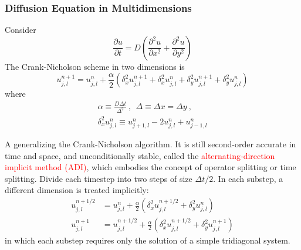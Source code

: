 \documentclass[12pt,a4paper]{article}
\begin{document}
\subsubsection{Diffusion Equation in Multidimensions}
Consider
\begin{equation}
\frac{\partial u}{\partial t} = D  \left( \frac{\partial^2 u}{\partial x^2} + \frac{\partial^2 u}{\partial y^2} \right)
\end{equation}
The Crank-Nicholson scheme in two dimensions is
\begin{equation}
u_{j, l}^{n+1} = u_{j, l}^{n} +\frac{\alpha}{2} \left(\delta_x^2 u_{j, l}^{n+1} +\delta_x^2 u_{j, l}^{n} +\delta_y^2 u_{j, l}^{n+1} +\delta_y^2 u_{j, l}^{n} \right)
\end{equation}
where
\begin{align}
\alpha \equiv \frac{D\Delta t}{\Delta^2} ~, ~~ \Delta \equiv \Delta x = \Delta y ~, \\
\delta_x^2 u_{j, l}^{n} \equiv u_{j+1, l}^{n} -2u_{j, l}^{n} +u_{j-1, l}^{n}
\end{align}

A generalizing the Crank-Nicholson algorithm. It is still second-order accurate in time and space, and unconditionally stable, called the \textcolor{red}{alternating-direction implicit method (ADI)}, which embodies the concept of operator splitting or time splitting. Divide each timestep into two steps of size $\Delta t/2$. In each substep, a different dimension is treated implicitly:
\begin{align}
u_{j, l}^{n+1/2} &= u_{j, l}^{n} +\frac{\alpha}{2} \left(\delta_x^2 u_{j, l}^{n+1/2} +\delta_y^2 u_{j, l}^{n} \right) \\
u_{j, l}^{n+1} &= u_{j, l}^{n+1/2} +\frac{\alpha}{2} \left(\delta_x^2 u_{j, l}^{n+1/2} +\delta_y^2 u_{j, l}^{n+1} \right)
\end{align}
in which each substep requires only the solution of a simple tridiagonal system.
\end{document}
